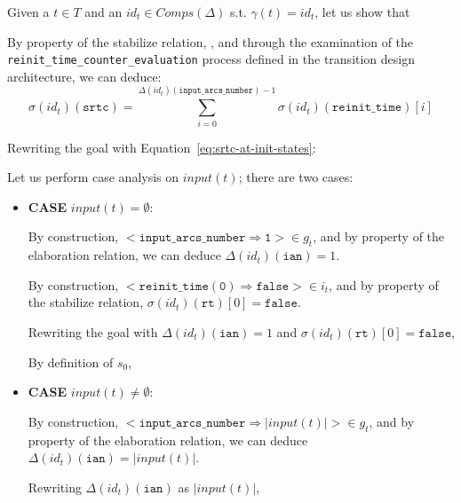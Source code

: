 \documentclass[dvipsnames,12pt]{article}
\begin{document}
\begin{niproof}
  Given a $t\in{}T$ and an $id_t\in{}Comps(\Delta)$
  s.t. $\gamma(t)=id_t$, let us show that\\

  \exT{}

  \noindent{}By property of the stabilize relation, \InCsCompT{}, and
  through the examination of the
  \texttt{reinit\_time\_counter\_evaluation} process defined in the
  transition design architecture, we can deduce:  
  \begin{equation}
    \sigma(id_t)(\texttt{srtc})=\sum\limits_{i=0}^{\Delta(id_t)(\texttt{input\_arcs\_number})-1}\sigma(id_t)(\texttt{reinit\_time})[i]\label{eq:srtc-at-init-states}
  \end{equation}

  Rewriting the goal with Equation~\eqref{eq:srtc-at-init-states}:
  
  Let us perform case analysis on $input(t)$; there are two cases:

  \begin{itemize}
  \item \textbf{CASE} $input(t)=\emptyset$:

    By construction,
    ${<}\mathtt{input\_arcs\_number\Rightarrow{}1}{>}\in{}g_t$, and
    by property of the \hvhdl{} elaboration relation, we can deduce
    $\Delta(id_t)(\texttt{ian})=1$.

    By construction,
    $<\mathtt{reinit\_time(0)\Rightarrow{}false}>\in{}i_t$, and by
    property of the \hvhdl{} stabilize relation,
    $\sigma(id_t)(\texttt{rt})[0]=\mathtt{false}$.

    Rewriting the goal with $\Delta(id_t)(\texttt{ian})=1$ and
    $\sigma(id_t)(\texttt{rt})[0]=\mathtt{false}$,

    By definition of $s_0$, 
    
  \item \textbf{CASE} $input(t)\neq{}\emptyset$:

    By construction,
    ${<}\mathtt{input\_arcs\_number\Rightarrow{}}\vert{}input(t)\vert{>}\in{}g_t$,
    and by property of the \hvhdl{} elaboration relation, we can
    deduce $\Delta(id_t)(\texttt{ian})=\vert{}input(t)\vert$.

    Rewriting $\Delta(id_t)(\texttt{ian})$ as $\vert{}input(t)\vert$,


\end{itemize}
\end{niproof}
\end{document}
